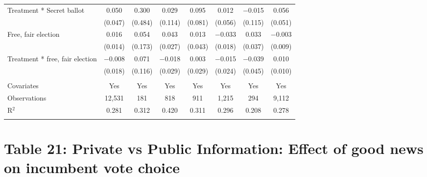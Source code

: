 \documentclass[]{article}
\begin{document}
\begin{table}[!htbp]
\begin{tabular}{@{\extracolsep{1pt}}lccccccc}
  Treatment * Secret ballot & 0.050 & 0.300 & 0.029 & 0.095 & 0.012 & $-$0.015 & 0.056 \\ 
  & (0.047) & (0.484) & (0.114) & (0.081) & (0.056) & (0.115) & (0.051) \\ 
  Free, fair election & 0.016 & 0.054 & 0.043 & 0.013 & $-$0.033 & 0.033 & $-$0.003 \\ 
  & (0.014) & (0.173) & (0.027) & (0.043) & (0.018) & (0.037) & (0.009) \\ 
  Treatment * free, fair election & $-$0.008 & 0.071 & $-$0.018 & 0.003 & $-$0.015 & $-$0.039 & 0.010 \\ 
  & (0.018) & (0.116) & (0.029) & (0.029) & (0.024) & (0.045) & (0.010) \\ 
 \hline \\[-1.8ex] 
Covariates & Yes & Yes & Yes & Yes & Yes & Yes & Yes \\ 
Observations & 12,531 & 181 & 818 & 911 & 1,215 & 294 & 9,112 \\ 
R$^{2}$ & 0.281 & 0.312 & 0.420 & 0.311 & 0.296 & 0.208 & 0.278 \\ 
\hline 
\hline \\[-1.8ex] 
\end{tabular} 
\end{table}

\clearpage

\section{Table 21: Private vs Public Information: Effect of good news on
incumbent vote
choice}\label{table-21-private-vs-public-information-effect-of-good-news-on-incumbent-vote-choice}
\end{document}

